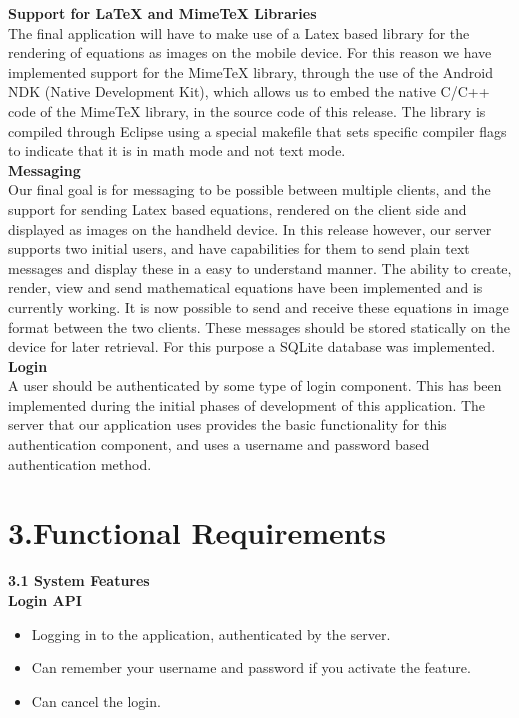 \documentclass[29pt,a4paper]{moderncv}
\begin{document}
		\noindent\textbf{Support for LaTeX and MimeTeX Libraries}
		\\The final application will have to make use of a Latex based library for the rendering of equations as images on the mobile device. For this reason we have implemented support for the MimeTeX library, through the use of the Android NDK (Native Development Kit), which allows us to embed the native C/C++ code of the MimeTeX library, in the source code of this release. The library is compiled through Eclipse using a special makefile that sets specific compiler flags to indicate that it is in math mode and not text mode.\\
		
		
		\noindent\textbf{Messaging}
		\\Our final goal is for messaging to be possible between multiple clients, and the support for sending Latex based equations, rendered on the client side and displayed as images on the handheld device. In this release however, our server supports two initial users, and have capabilities for them to send plain text messages and display these in a easy to understand manner.  
		\parindent 5mm The ability to create, render, view and send mathematical equations have been implemented and is currently working. It is now possible to send and receive these equations in image format between the two clients.
		These messages should be stored statically on the device for later retrieval.  For this purpose a SQLite database was implemented.\\
		
		\noindent\textbf{Login}
		\\A user should be authenticated by some type of login component.  This has been implemented during the initial phases of development of this application.  The server that our application uses provides the basic functionality for this authentication component, and uses a username and password based authentication method.
		
		
	\vspace{5mm}
	
\newpage	
	\section*{\textbf{3.Functional Requirements}}
	\vspace{4mm}
	\noindent \textbf{3.1 System Features}\\
	
		\noindent \textbf{Login API}
		\begin{itemize}
			\item Logging in to the application, authenticated by the server.
			\item Can remember your username and password if you activate the feature.
			\item Can cancel the login.\\
		\end{itemize}
		
\end{document}

